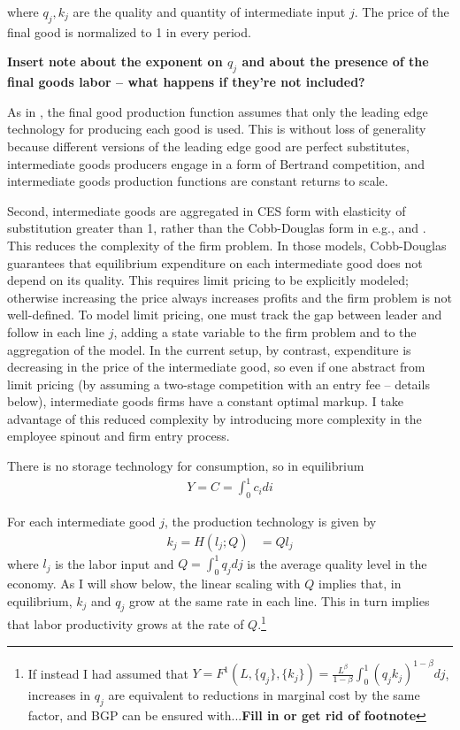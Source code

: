 \documentclass[12pt,english]{article}
\theoremstyle{remark}
\begin{document}
where $q_j,k_j$ are the quality and quantity of intermediate input $j$. 
The price of the final good is normalized to 1 in every period. 

\textbf{Insert note about the exponent on $q_j$ and about the presence of the final goods labor -- what happens if they're not included?}

As in \cite{akcigit_growth_2018}, the final good production function assumes that only the leading edge technology for producing each good is used. This is without loss of generality because different versions of the leading edge good are perfect substitutes, intermediate goods producers engage in a form of Bertrand competition, and intermediate goods production functions are constant returns to scale. 

Second, intermediate goods are aggregated in CES form with elasticity of substitution greater than 1, rather than the Cobb-Douglas form in e.g., \cite{grossman_quality_1991} and \cite{baslandze_spinout_2019}. This reduces the complexity of the firm problem. In those models, Cobb-Douglas guarantees that equilibrium expenditure on each intermediate good does not depend on its quality. This requires limit pricing to be explicitly modeled; otherwise increasing the price always increases profits and the firm problem is not well-defined. To model limit pricing, one must track the gap between leader and follow in each line $j$, adding a state variable to the firm problem and to the aggregation of the model. In the current setup, by contrast, expenditure is decreasing in the price of the intermediate good, so even if one abstract from limit pricing (by assuming a two-stage competition with an entry fee -- details below), intermediate goods firms have a constant optimal markup. I take advantage of this reduced complexity by introducing more complexity in the employee spinout and firm entry process.

There is no storage technology for consumption, so in equilibrium
\begin{align*}
Y = C = \int_0^1 c_i di
\end{align*}

For each intermediate good $j$, the production technology is given by
\begin{align*}
k_j = H(l_j;Q) &= Q l_j
\end{align*}
where $l_j$ is the labor input and $Q = \int_0^1 q_j dj$ is the average quality level in the economy. As I will show below, the linear scaling with $Q$ implies that, in equilibrium, $k_j$ and $q_j$ grow at the same rate in each line. This in turn implies that labor productivity grows at the rate of $Q$.\footnote{If instead I had assumed that $Y = F^1(L,\{q_j\},\{k_j\}) = \frac{L^{\beta}}{1-\beta} \int_0^1 (q_j k_j)^{1-\beta} dj$, increases in $q_j$ are equivalent to reductions in marginal cost by the same factor, and BGP can be ensured with...\textbf{Fill in or get rid of footnote}}
\end{document}
